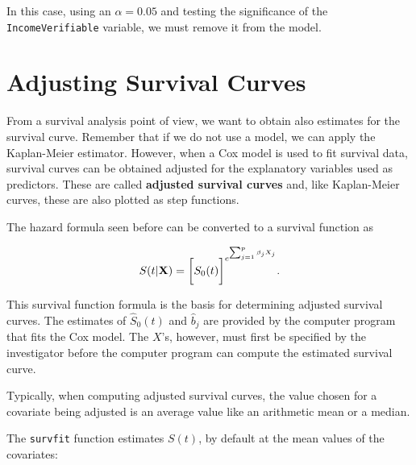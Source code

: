 \documentclass[]{book}
\makeatletter
\newenvironment{Shaded}{\begin{snugshade}}{\end{snugshade}}
\newcommand{\KeywordTok}[1]{\textcolor[rgb]{0.13,0.29,0.53}{\textbf{#1}}}
\newcommand{\DataTypeTok}[1]{\textcolor[rgb]{0.13,0.29,0.53}{#1}}
\newcommand{\DecValTok}[1]{\textcolor[rgb]{0.00,0.00,0.81}{#1}}
\newcommand{\StringTok}[1]{\textcolor[rgb]{0.31,0.60,0.02}{#1}}
\newcommand{\CommentTok}[1]{\textcolor[rgb]{0.56,0.35,0.01}{\textit{#1}}}
\newcommand{\OtherTok}[1]{\textcolor[rgb]{0.56,0.35,0.01}{#1}}
\newcommand{\OperatorTok}[1]{\textcolor[rgb]{0.81,0.36,0.00}{\textbf{#1}}}
\newcommand{\NormalTok}[1]{#1}
\newenvironment{kframe}{%
\medskip{}
\setlength{\fboxsep}{.8em}
 \def\at@end@of@kframe{}%
 \ifinner\ifhmode%
  \def\at@end@of@kframe{\end{minipage}}%
  \begin{minipage}{\columnwidth}%
 \fi\fi%
 \def\FrameCommand##1{\hskip\@totalleftmargin \hskip-\fboxsep
 \colorbox{shadecolor}{##1}\hskip-\fboxsep
     \hskip-\linewidth \hskip-\@totalleftmargin \hskip\columnwidth}%
 \MakeFramed {\advance\hsize-\width
   \@totalleftmargin\z@ \linewidth\hsize
   \@setminipage}}%
 {\par\unskip\endMakeFramed%
 \at@end@of@kframe}
\renewenvironment{Shaded}{\begin{kframe}}{\end{kframe}}
\theoremstyle{definition}
\theoremstyle{definition}
\theoremstyle{definition}
\theoremstyle{remark}
\let\BeginKnitrBlock\begin \let\EndKnitrBlock\end
\makeatother
\begin{document}
In this case, using an \(\alpha = 0.05\) and testing the significance of
the \texttt{IncomeVerifiable} variable, we must remove it from the
model.

\section{Adjusting Survival Curves}\label{adjusting-survival-curves}

From a survival analysis point of view, we want to obtain also estimates
for the survival curve. Remember that if we do not use a model, we can
apply the Kaplan-Meier estimator. However, when a Cox model is used to
fit survival data, survival curves can be obtained adjusted for the
explanatory variables used as predictors. These are called
\textbf{adjusted survival curves} and, like Kaplan-Meier curves, these
are also plotted as step functions.

The hazard formula seen before can be converted to a survival function
as

\[
S(t|\textbf X) = \bigg[ S_0(t) \bigg]^{e^{\sum_{j=1}^p \beta_j X_j}}.
\]

This survival function formula is the basis for determining adjusted
survival curves. The estimates of \(\hat S_0(t)\) and \(\hat b_j\) are
provided by the computer program that fits the Cox model. The \(X\)'s,
however, must first be specified by the investigator before the computer
program can compute the estimated survival curve.

\BeginKnitrBlock{rmdhint_sestelo}
Typically, when computing adjusted survival curves, the value chosen for
a covariate being adjusted is an average value like an arithmetic mean
or a median.
\EndKnitrBlock{rmdhint_sestelo}

The \texttt{survfit} function estimates \(S(t)\), by default at the mean
values of the covariates:

\begin{Shaded}
\end{Shaded}
\end{document}
